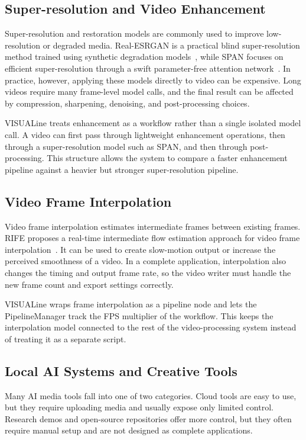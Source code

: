 \documentclass[11pt,a4paper]{article}
\begin{document}
\subsection{Super-resolution and Video Enhancement}

Super-resolution and restoration models are commonly used to improve low-resolution or degraded media. Real-ESRGAN is a practical blind super-resolution method trained using synthetic degradation models~\cite{wang2021realesrgan}, while SPAN focuses on efficient super-resolution through a swift parameter-free attention network~\cite{wan2024span}. In practice, however, applying these models directly to video can be expensive. Long videos require many frame-level model calls, and the final result can be affected by compression, sharpening, denoising, and post-processing choices.

VISUALine treats enhancement as a workflow rather than a single isolated model call. A video can first pass through lightweight enhancement operations, then through a super-resolution model such as SPAN, and then through post-processing. This structure allows the system to compare a faster enhancement pipeline against a heavier but stronger super-resolution pipeline.

\subsection{Video Frame Interpolation}

Video frame interpolation estimates intermediate frames between existing frames. RIFE proposes a real-time intermediate flow estimation approach for video frame interpolation~\cite{huang2022rife}. It can be used to create slow-motion output or increase the perceived smoothness of a video. In a complete application, interpolation also changes the timing and output frame rate, so the video writer must handle the new frame count and export settings correctly.

VISUALine wraps frame interpolation as a pipeline node and lets the PipelineManager track the FPS multiplier of the workflow. This keeps the interpolation model connected to the rest of the video-processing system instead of treating it as a separate script.

\subsection{Local AI Systems and Creative Tools}

Many AI media tools fall into one of two categories. Cloud tools are easy to use, but they require uploading media and usually expose only limited control. Research demos and open-source repositories offer more control, but they often require manual setup and are not designed as complete applications.
\end{document}
